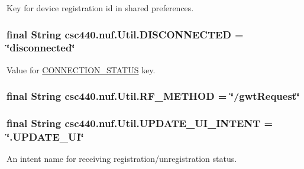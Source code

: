 Key for device registration id in shared preferences. \hypertarget{classcsc440_1_1nuf_1_1_util_acc59e40c430a78ba6bb0cc45bd616c2b}{
\subsubsection[{D\-I\-S\-C\-O\-N\-N\-E\-C\-T\-E\-D}]{\setlength{\rightskip}{0pt plus 5cm}final String {\bf csc440.\-nuf.\-Util.\-D\-I\-S\-C\-O\-N\-N\-E\-C\-T\-E\-D} = \char`\"{}disconnected\char`\"{}}}\label{classcsc440_1_1nuf_1_1_util_acc59e40c430a78ba6bb0cc45bd616c2b}
Value for \hyperlink{classcsc440_1_1nuf_1_1_util_ae827ff85c7a597b88b411a982eb41ad7}{C\-O\-N\-N\-E\-C\-T\-I\-O\-N\-\_\-\-S\-T\-A\-T\-U\-S} key. \hypertarget{classcsc440_1_1nuf_1_1_util_a168e27d595b96d0e784d5f32a6f5e125}{
\subsubsection[{R\-F\-\_\-\-M\-E\-T\-H\-O\-D}]{\setlength{\rightskip}{0pt plus 5cm}final String {\bf csc440.\-nuf.\-Util.\-R\-F\-\_\-\-M\-E\-T\-H\-O\-D} = \char`\"{}/gwt\-Request\char`\"{}}}\label{classcsc440_1_1nuf_1_1_util_a168e27d595b96d0e784d5f32a6f5e125}
\hypertarget{classcsc440_1_1nuf_1_1_util_a3376e622f91a209d996ed066878f3ff5}{
\subsubsection[{U\-P\-D\-A\-T\-E\-\_\-\-U\-I\-\_\-\-I\-N\-T\-E\-N\-T}]{\setlength{\rightskip}{0pt plus 5cm}final String {\bf csc440.\-nuf.\-Util.\-U\-P\-D\-A\-T\-E\-\_\-\-U\-I\-\_\-\-I\-N\-T\-E\-N\-T} = \char`\"{}.U\-P\-D\-A\-T\-E\-\_\-\-U\-I\char`\"{}}}\label{classcsc440_1_1nuf_1_1_util_a3376e622f91a209d996ed066878f3ff5}
An intent name for receiving registration/unregistration status. 

